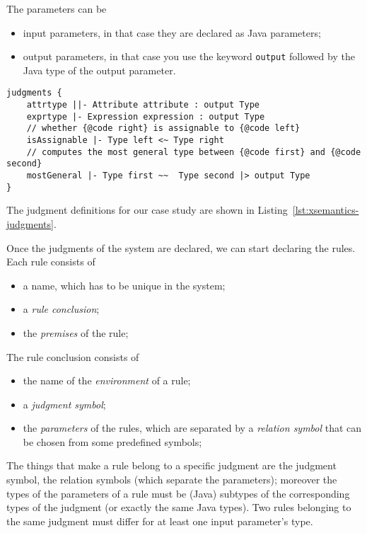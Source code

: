 \noindent
The parameters can be

\begin{itemize}
\item 
input parameters, in that case they are declared as Java parameters;
\item 
output parameters, in that case you use the keyword
\lstinline[breakatwhitespace=false,breaklines=true]|output| followed by the Java
type of the output parameter.
\end{itemize}

\begin{lstlisting}[language=xsemantics,float,label=lst:xsemantics-judgments,caption=Judgment
definitions in Xsemantics]
judgments {
	attrtype ||- Attribute attribute : output Type
	exprtype |- Expression expression : output Type
	// whether {@code right} is assignable to {@code left}
	isAssignable |- Type left <~ Type right
	// computes the most general type between {@code first} and {@code second}
	mostGeneral |- Type first ~~  Type second |> output Type
}
\end{lstlisting}

\noindent
The judgment definitions for our case study are shown in
Listing~\ref{lst:xsemantics-judgments}.

Once the judgments of the system are declared, we can start declaring the
rules.  Each rule consists of

\begin{itemize}
\item
a name, which has to be unique in the system;
\item
a \textit{rule conclusion};
\item
the \textit{premises} of the rule;
\end{itemize}

\noindent
The rule conclusion consists of

\begin{itemize}
\item
the name of the \textit{environment} of a rule;
\item
a \textit{judgment symbol};
\item
the \textit{parameters} of the rules, which are separated by
a \textit{relation symbol} that can be chosen from some predefined symbols;
\end{itemize}

The things that make a rule belong to a specific judgment are the judgment
symbol, the relation symbols (which separate the parameters); moreover the types
of the parameters of a rule must be (Java) subtypes of the corresponding types
of the judgment (or exactly the same Java types).  Two rules belonging to the
same judgment must differ for at least one input parameter's type.


